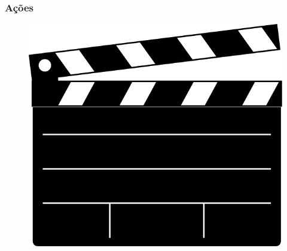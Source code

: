 %
%
\begin{frame}\frametitle{Ações}

	\begin{figure}[h]
        \centering
        \includegraphics[scale=0.5]{images/action.png}
    \end{figure}
    
\end{frame}


